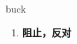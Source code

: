
\begin{frame}
{\huge buck}
\begin{center}
\begin{enumerate}\Large
  \item \textbf{阻止，反对}
\end{enumerate}
\end{center}
\end{frame}
